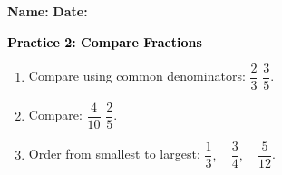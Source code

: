 \documentclass[12pt, letterpaper, fleqn]{article}
\newcommand{\blank}{\underline{\hspace{2.2cm}}}
\begin{document}
\textbf{Name:} \underline{\hspace{5cm}}
\hfill
\textbf{Date:} \underline{\hspace{3cm}}\\

\begin{tcolorbox}[colback=customteal!20]
    \large\textcolor{black}{\textbf{Practice 2: Compare Fractions}}
\end{tcolorbox}
\begin{enumerate}[itemsep=3.5cm, leftmargin=0.6cm]
\item Compare using common denominators: $\dfrac{2}{3}$ \blank $\dfrac{3}{5}$.
\vspace{3.5cm}
\item Compare: $\dfrac{4}{10}$ \blank $\dfrac{2}{5}$.
\vspace{3.5cm}
\item Order from smallest to largest: $\dfrac{1}{3}, \quad \dfrac{3}{4}, \quad \dfrac{5}{12}$.
\end{enumerate}
\end{document}
